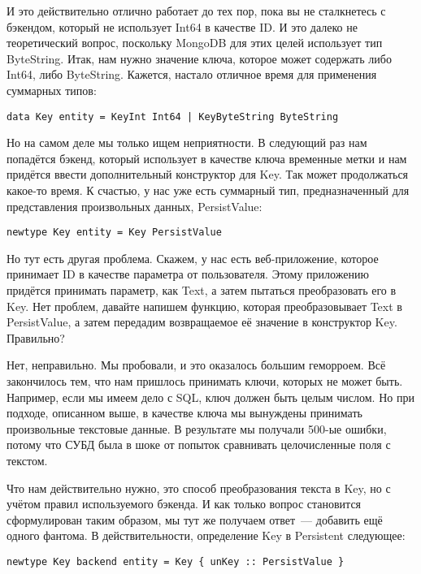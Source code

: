 И это действительно отлично работает до тех пор, пока вы не сталкнетесь с
бэкендом, который не использует Int64 в качестве ID. И это далеко не
теоретический вопрос, поскольку MongoDB для этих целей использует тип
ByteString. Итак, нам нужно значение ключа, которое может содержать либо Int64,
либо ByteString. Кажется, настало отличное время для применения суммарных
типов:

\begin{lstlisting}
data Key entity = KeyInt Int64 | KeyByteString ByteString
\end{lstlisting}

Но на самом деле мы только ищем неприятности. В следующий раз нам попадётся
бэкенд, который использует в качестве ключа временные метки и нам придётся
ввести дополнительный конструктор для Key. Так может продолжаться какое-то
время. К счастью, у нас уже есть суммарный тип, предназначенный для
представления произвольных данных, PersistValue:

\begin{lstlisting}
newtype Key entity = Key PersistValue
\end{lstlisting}

Но тут есть другая проблема. Скажем, у нас есть веб-приложение, которое
принимает ID в качестве параметра от пользователя. Этому приложению придётся
принимать параметр, как Text, а затем пытаться преобразовать его в Key. Нет
проблем, давайте напишем функцию, которая преобразовывает Text в PersistValue,
а затем передадим возвращаемое её значение в конструктор Key. Правильно?

Нет, неправильно. Мы пробовали, и это оказалось большим геморроем. Всё
закончилось тем, что нам пришлось принимать ключи, которых не может быть.
Например, если мы имеем дело с SQL, ключ должен быть целым числом. Но при
подходе, описанном выше, в качестве ключа мы вынуждены принимать произвольные
текстовые данные. В результате мы получали 500-ые ошибки, потому что СУБД была
в шоке от попыток сравнивать целочисленные поля с текстом.

Что нам действительно нужно, это способ преобразования текста в Key, но с
учётом правил используемого бэкенда. И как только вопрос становится
сформулирован таким образом, мы тут же получаем ответ~--- добавить ещё одного
фантома. В действительности, определение Key в Persistent следующее:

\begin{lstlisting}
newtype Key backend entity = Key { unKey :: PersistValue }
\end{lstlisting}

